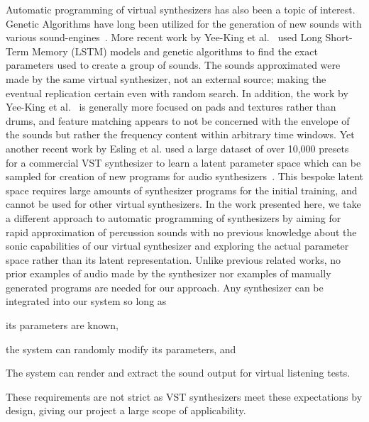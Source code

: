 \documentclass[\main/thesis.tex]{subfiles}
\begin{document}
Automatic programming of virtual synthesizers has also been a topic of interest. Genetic Algorithms have long been utilized for the generation of new sounds with various sound-engines~\cite{johnson1999exploring,dahlstedt2001creating,hornermachinetongues,macret2012automatic}. More recent work by Yee-King et al.~\cite{yee2018automatic} used Long Short-Term Memory (LSTM) models and genetic algorithms to find the exact parameters used to create a group of sounds. The sounds approximated were made by the same virtual synthesizer, not an external source; making the eventual replication certain even with random search. In addition, the work by Yee-King et al.~\cite{yee2018automatic} is generally more focused on pads and textures rather than drums, and feature matching appears to not be concerned with the envelope of the sounds but rather the frequency content within arbitrary time windows. Yet another recent work by Esling et al. used a large dataset of over 10,000 presets for a commercial VST synthesizer to learn a latent parameter space which can be sampled for creation of new programs for audio synthesizers~\cite{esling2019universal}. This bespoke latent space requires large amounts of synthesizer programs for the initial training, and cannot be used for other virtual synthesizers. In the work presented here, we take a different approach to automatic programming of synthesizers by aiming for rapid approximation of percussion sounds with no previous knowledge about the sonic capabilities of our virtual synthesizer and exploring the actual parameter space rather than its latent representation. Unlike previous related works, no prior examples of audio made by the synthesizer nor examples of manually generated programs are needed for our approach. Any synthesizer can be integrated into our system so long as \begin {enumerate*} [label=\itshape\alph*\upshape)]
  \item its parameters are known,
  \item the system can randomly modify its parameters, and
  \item The system can render and extract the sound output for virtual listening tests.
\end{enumerate*}  
These requirements are not strict as VST synthesizers meet these expectations by design, giving our project a large scope of applicability. 
\end{document}
